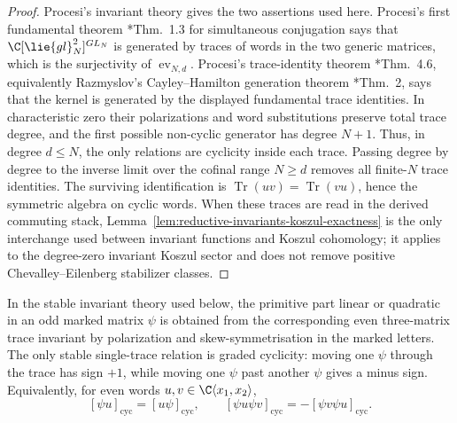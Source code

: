 \documentclass[11pt]{memoir}
\begin{document}
\begin{proof}
  Procesi's invariant theory gives the two assertions used here.
  Procesi's first fundamental theorem
  \cite{procesi}*{Thm.~1.3} for simultaneous conjugation says that
  \(\C[\lie{gl}_N^2]^{GL_N}\) is generated by traces of words in the two
  generic matrices, which is the surjectivity of
  \(\operatorname{ev}_{N,d}\).  Procesi's trace-identity theorem
  \cite{procesi}*{Thm.~4.6}, equivalently Razmyslov's
  Cayley--Hamilton generation theorem \cite{razmyslov}*{Thm.~2}, says
  that the kernel is generated by the displayed fundamental trace
  identities.  In characteristic zero their polarizations and word
  substitutions preserve total trace degree, and the first possible
  non-cyclic generator has degree \(N+1\).  Thus, in degree \(d\leq N\),
  the only relations are cyclicity inside each trace.  Passing degree by
  degree to the inverse limit over the cofinal range \(N\geq d\) removes
  all finite-\(N\) trace identities.  The surviving identification is
  \(\operatorname{Tr}(uv)=\operatorname{Tr}(vu)\), hence the symmetric
  algebra on cyclic words.  When these traces are read in the derived
  commuting stack, Lemma~\ref{lem:reductive-invariants-koszul-exactness}
  is the only interchange used between invariant functions and Koszul
  cohomology; it applies to the degree-zero invariant Koszul sector and
  does not remove positive Chevalley--Eilenberg stabilizer classes.
\end{proof}

\begin{lem}\label{lem:stable-marked-traces}
  In the stable invariant theory used below, the primitive part linear or
  quadratic in an odd marked matrix $\psi$ is obtained from the corresponding
  even three-matrix trace invariant by polarization and skew-symmetrisation in
  the marked letters. The only stable single-trace relation is graded cyclicity:
  moving one $\psi$ through the trace has sign $+1$, while moving one $\psi$
  past another $\psi$ gives a minus sign.  Equivalently, for even words
  \(u,v\in\C\langle x_1,x_2\rangle\),
  \[
    [\psi u]_{\mathrm{cyc}}=[u\psi]_{\mathrm{cyc}},\qquad
    [\psi u\psi v]_{\mathrm{cyc}}
      =
    -[\psi v\psi u]_{\mathrm{cyc}} .
  \]
\end{lem}
\end{document}
